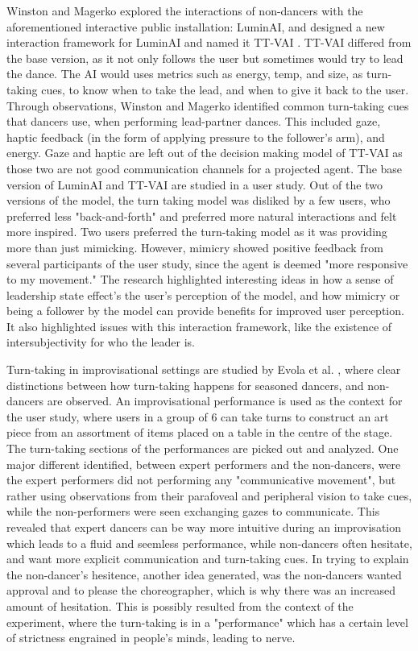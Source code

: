 \documentclass[final,5p,times,twocolumn,authoryear]{article}
\begin{document}
Winston and Magerko explored the interactions of non-dancers with the
aforementioned interactive public installation: LuminAI, and designed a
new interaction framework for LuminAI and named it TT-VAI
\cite{Winston2017}. TT-VAI differed from the base version, as it not only
follows the user but sometimes would try to lead the dance.  The AI
would uses metrics such as energy, temp, and size, as turn-taking cues,
to know when to
take the lead, and when to give it back to the user. Through
observations, Winston and Magerko identified common turn-taking cues
that dancers use, when performing lead-partner dances.  This included
gaze, haptic feedback (in the form of applying pressure to the
follower's arm), and energy. Gaze and haptic are left out of the
decision making model of TT-VAI as those two are not good communication
channels for a projected agent. The base version of LuminAI and TT-VAI
are studied in a user study. Out of the two versions of the model, the
turn taking model was disliked by a few users, who preferred less
"back-and-forth" and preferred more natural interactions and felt more
inspired. Two users preferred the turn-taking model as it was providing
more than just mimicking. However, mimicry showed positive feedback from
several participants of the user study, since the agent is deemed "more
responsive to my movement." The research highlighted interesting ideas
in how a sense of leadership state effect's the user's perception of the
model, and how mimicry or being a follower by the model can provide
benefits for improved user perception. It also highlighted issues with
this interaction framework, like the existence of intersubjectivity for
who the leader is.

Turn-taking in improvisational settings are studied by Evola et al.
\cite{Evola}, where clear distinctions between how turn-taking happens
for seasoned dancers, and non-dancers are observed.  An improvisational
performance is used as the context for the user study, where users in a
group of 6 can take turns to construct an art piece from an assortment
of items placed on a table in the centre of the stage. The turn-taking
sections of the performances are picked out and analyzed.  One major
different identified, between expert performers and the non-dancers,
were the expert performers did not performing any "communicative
movement", but rather using observations from their parafoveal and
peripheral vision to take cues, while the non-performers were seen
exchanging gazes to communicate. This revealed that expert dancers can
be way more intuitive during an improvisation which leads to a fluid and
seemless performance, while non-dancers often hesitate, and want more
explicit communication and turn-taking cues. In trying to explain the
non-dancer's hesitence, another idea generated, was the non-dancers
wanted approval and to please the choreographer, which is why there was
an increased amount of hesitation. This is possibly resulted from the
context of the experiment, where the turn-taking is in a "performance"
which has a certain level of strictness engrained in people's minds,
leading to nerve.
\end{document}
